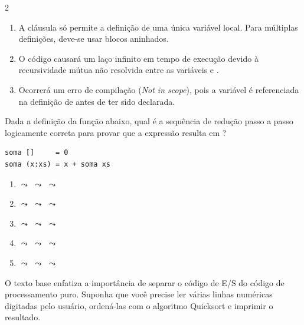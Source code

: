 \documentclass[a4paper,10pt,brazil]{article}
\begin{document}
\begin{multicols}{2}
\begin{enumerate}
  \item A cláusula  só permite a definição de uma única variável local. Para múltiplas definições, deve-se usar blocos  aninhados.

  \item O código causará um laço infinito em tempo de execução devido à recursividade mútua não resolvida entre as variáveis  e .

  \item Ocorrerá um erro de compilação (\emph{Not in scope}), pois a variável  é referenciada na definição de  antes de ter sido declarada.


\end{enumerate}

Dada a definição da função  abaixo, qual é a sequência de redução passo a passo logicamente correta para provar que a expressão  resulta em ?

\begin{verbatim}
soma []     = 0
soma (x:xs) = x + soma xs
\end{verbatim}

\begin{enumerate}
  \item {} $\leadsto$  $\leadsto$  $\leadsto$ 

  \item {} $\leadsto$  $\leadsto$  $\leadsto$ 

  \item {} $\leadsto$  $\leadsto$  $\leadsto$ 

  \item {} $\leadsto$  $\leadsto$  $\leadsto$ 

  \item {} $\leadsto$  $\leadsto$  $\leadsto$ 


\end{enumerate}

O texto base enfatiza a importância de separar o código de E/S do código de processamento puro. Suponha que você precise ler várias linhas numéricas digitadas pelo usuário, ordená-las com o algoritmo Quicksort e imprimir o resultado. 


\end{multicols}
\end{document}
